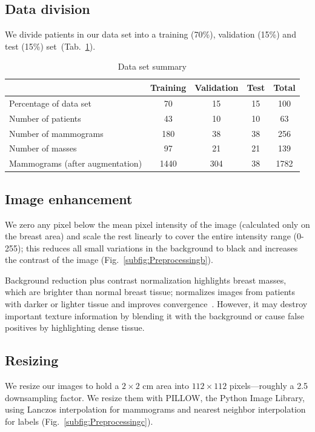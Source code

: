 \subsection{Data division}
We divide patients in our data set into a training (70\%), validation (15\%) and test (15\%) set~(Tab.~\ref{tab:DataSetSummary}).

\begin{table}[h]
	\centering
	\begin{tabular}{lcccc}
		\hline
		&\textbf{Training} & \textbf{Validation} & \textbf{Test} & \textbf{Total}\\
		\hline 
		Percentage of data set	&70		&15	&15	&100\\
		Number of patients		&43		&10	&10	&63\\
		Number of mammograms 	&180	&38	&38	&256\\
		Number of masses 		&97		&21	&21	&139\\
		Mammograms (after augmentation) &1440 &304 &38	&1782\\
		\hline
	\end{tabular}
	\caption[Data set summary]{Data set summary}
	\label{tab:DataSetSummary}
\end{table}

\subsection{Image enhancement}
We zero any pixel below the mean pixel intensity of the image (calculated only on the breast area) and scale the rest linearly to cover the entire intensity range (0-255); this reduces all small variations in the background to black and increases the contrast of the image (Fig.~\ref{subfig:Preprocessingb}).

Background reduction plus contrast normalization highlights breast masses, which are brighter than normal breast tissue; normalizes images from patients with darker or lighter tissue and improves convergence~\cite{Arevalo2016}. However, it may destroy important texture information by blending it with the background or cause false positives by highlighting dense tissue.

\subsection{Resizing}
We resize our images to hold a $2 \times 2$ cm area into $112 \times 112$ pixels---roughly a 2.5 downsampling factor.
We resize them with PILLOW, the Python Image Library, using Lanczos interpolation for mammograms and nearest neighbor interpolation for labels (Fig.~\ref{subfig:Preprocessingc}).

